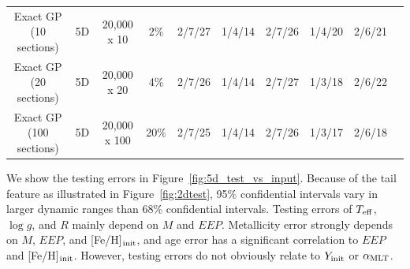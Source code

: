 \begin{table}
\begin{tabular}{cccccccccc}
		 Exact GP (10 sections) & 5D& 20,000 x 10 & 2\% & 2/7/27  & 1/4/14 & 2/7/26 &1/4/20 & 2/6/21\\
		 Exact GP (20 sections) & 5D& 20,000 x 20 & 4\% & 2/7/26  & 1/4/14 & 2/7/27 &1/3/18 & 2/6/22 \\
		  Exact GP (100 sections) & 5D& 20,000 x 100 & 20\% & 2/7/25  & 1/4/14 & 2/7/26 &1/3/17 & 2/6/18 \\
		  \hline
	\end{tabular}
\end{table}


We show the testing errors in Figure~\ref{fig:5d_test_vs_input}. 
%
Because of the tail feature as illustrated in Figure~\ref{fig:2dtest}, 95\% confidential intervals vary in larger dynamic ranges than 68\% confidential intervals.  
%
Testing errors of $T_{\rm eff}$, $\log g$, and $R$ mainly depend on $M$ and $EEP$. Metallicity error strongly depends on $M$, $EEP$, and [Fe/H]$_{\rm init}$, and age error has a significant correlation to $EEP$ and [Fe/H]$_{\rm init}$. However, testing errors do not obviously relate to $Y_{\rm init}$ or $\alpha_{\rm MLT}$. 


